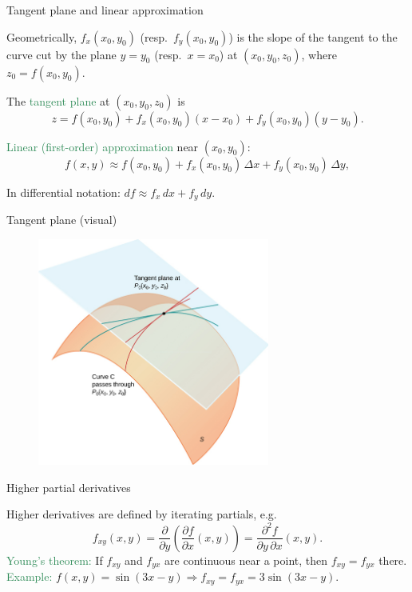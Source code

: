 \documentclass[11pt,aspectratio=169]{beamer}
\begin{document}
\begin{frame}{Tangent plane and linear approximation}

Geometrically, \(f_x(x_0,y_0)\) (resp.\ \(f_y(x_0,y_0)\)) is the slope of the tangent to the curve cut by the plane \(y=y_0\) (resp.\ \(x=x_0\)) at \((x_0,y_0,z_0)\), where \(z_0=f(x_0,y_0)\).

\vskip 6pt
The \textcolor{SeaGreen}{tangent plane} at \((x_0,y_0,z_0)\) is
\[
z = f(x_0,y_0)+f_x(x_0,y_0)(x-x_0)+f_y(x_0,y_0)(y-y_0).
\]

\vskip 6pt
\textcolor{SeaGreen}{Linear (first-order) approximation} near \((x_0,y_0)\):
\[
f(x,y)\approx f(x_0,y_0)+f_x(x_0,y_0)\,\Delta x+f_y(x_0,y_0)\,\Delta y,
\]
\medskip

In differential notation: \(df\approx f_x\,dx+f_y\,dy\).
\end{frame}
\begin{frame}{Tangent plane (visual)}
\begin{figure}
\includegraphics[width=3in]{img/tp.jpg}
\end{figure}
\end{frame}

\begin{frame}{Higher partial derivatives}

Higher derivatives are defined by iterating partials, e.g.
\[
f_{xy}(x,y)=\frac{\partial}{\partial y}\!\left(\frac{\partial f}{\partial x}(x,y)\right)
=\frac{\partial^2 f}{\partial y\,\partial x}(x,y).
\]
\vskip 6pt
\textcolor{SeaGreen}{Young's theorem:} If \(f_{xy}\) and \(f_{yx}\) are continuous near a point, then \(f_{xy}=f_{yx}\) there.
\vskip 4pt
\textcolor{SeaGreen}{Example:} \(f(x,y)=\sin(3x-y)\Rightarrow f_{xy}=f_{yx}=3\sin(3x-y)\).

\end{frame}
\end{document}
